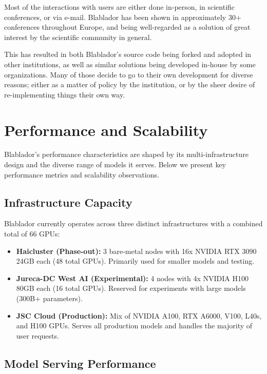 \documentclass[10pt,conference]{IEEEtran}
\begin{document}
    Most of the interactions with users are either done in-person, in scientific conferences, or via e-mail. Blablador has been shown in approximately 30+ conferences throughout Europe, and being well-regarded as a solution of great interest by the scientific community in general. 

    This has resulted in both Blablador's source code being forked and adopted in other institutions, as well as similar solutions being developed in-house by some organizations. Many of those decide to go to their own development for diverse reasons; either as a matter of policy by the institution, or by the sheer desire of re-implementing things their own way.


\section{Performance and Scalability}

Blablador's performance characteristics are shaped by its multi-infrastructure design and the diverse range of models it serves. Below we present key performance metrics and scalability observations.

\subsection{Infrastructure Capacity}

Blablador currently operates across three distinct infrastructures with a combined total of 66 GPUs:

\begin{itemize}
    \item \textbf{Haicluster (Phase-out):} 3 bare-metal nodes with 16x NVIDIA RTX 3090 24GB each (48 total GPUs). Primarily used for smaller models and testing.
    \item \textbf{Jureca-DC West AI (Experimental):} 4 nodes with 4x NVIDIA H100 80GB each (16 total GPUs). Reserved for experiments with large models (300B+ parameters).
    \item \textbf{JSC Cloud (Production):} Mix of NVIDIA A100, RTX A6000, V100, L40s, and H100 GPUs. Serves all production models and handles the majority of user requests.
\end{itemize}

\subsection{Model Serving Performance}
\end{document}
